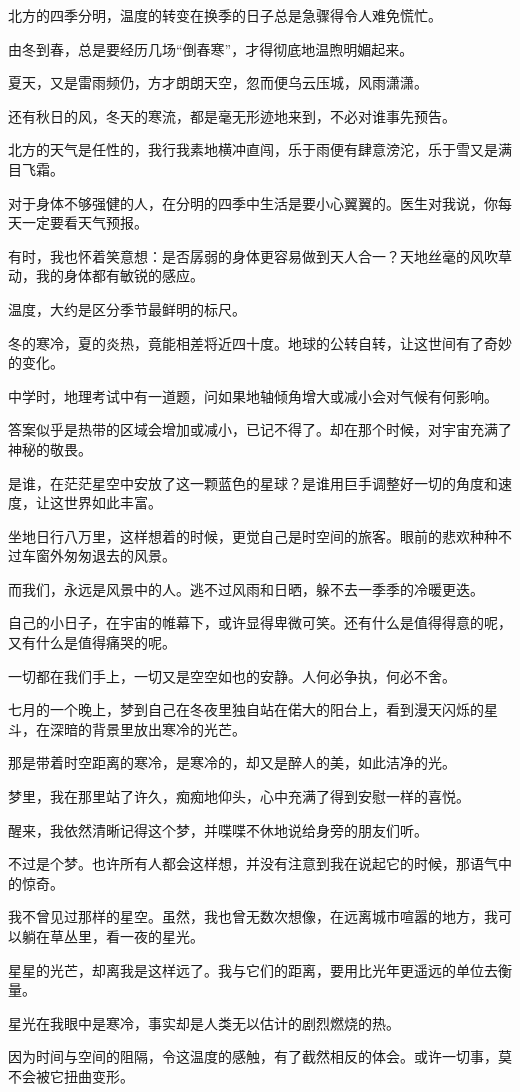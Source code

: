 \documentclass[12pt,a4paper]{article}
\def\blankrev{\vspace{1ex}}									%
\begin{document}
		\blankrev
		北方的四季分明，温度的转变在换季的日子总是急骤得令人难免慌忙。\par
		由冬到春，总是要经历几场“倒春寒”，才得彻底地温煦明媚起来。\par
		夏天，又是雷雨频仍，方才朗朗天空，忽而便乌云压城，风雨潇潇。\par
		还有秋日的风，冬天的寒流，都是毫无形迹地来到，不必对谁事先预告。\par
		北方的天气是任性的，我行我素地横冲直闯，乐于雨便有肆意滂沱，乐于雪又是满目飞霜。\par
		对于身体不够强健的人，在分明的四季中生活是要小心翼翼的。医生对我说，你每天一定要看天气预报。\par
		有时，我也怀着笑意想：是否孱弱的身体更容易做到天人合一？天地丝毫的风吹草动，我的身体都有敏锐的感应。

		\blankrev
		温度，大约是区分季节最鲜明的标尺。\par
		冬的寒冷，夏的炎热，竟能相差将近四十度。地球的公转自转，让这世间有了奇妙的变化。\par
		中学时，地理考试中有一道题，问如果地轴倾角增大或减小会对气候有何影响。\par
		答案似乎是热带的区域会增加或减小，已记不得了。却在那个时候，对宇宙充满了神秘的敬畏。\par
		是谁，在茫茫星空中安放了这一颗蓝色的星球？是谁用巨手调整好一切的角度和速度，让这世界如此丰富。\par
		坐地日行八万里，这样想着的时候，更觉自己是时空间的旅客。眼前的悲欢种种不过车窗外匆匆退去的风景。\par
		而我们，永远是风景中的人。逃不过风雨和日晒，躲不去一季季的冷暖更迭。\par
		自己的小日子，在宇宙的帷幕下，或许显得卑微可笑。还有什么是值得得意的呢，又有什么是值得痛哭的呢。\par
		一切都在我们手上，一切又是空空如也的安静。人何必争执，何必不舍。

		\blankrev
		七月的一个晚上，梦到自己在冬夜里独自站在偌大的阳台上，看到漫天闪烁的星斗，在深暗的背景里放出寒冷的光芒。\par
		那是带着时空距离的寒冷，是寒冷的，却又是醉人的美，如此洁净的光。\par
		梦里，我在那里站了许久，痴痴地仰头，心中充满了得到安慰一样的喜悦。\par
		醒来，我依然清晰记得这个梦，并喋喋不休地说给身旁的朋友们听。\par
		不过是个梦。也许所有人都会这样想，并没有注意到我在说起它的时候，那语气中的惊奇。\par
		我不曾见过那样的星空。虽然，我也曾无数次想像，在远离城市喧嚣的地方，我可以躺在草丛里，看一夜的星光。\par
		星星的光芒，却离我是这样远了。我与它们的距离，要用比光年更遥远的单位去衡量。\par
		星光在我眼中是寒冷，事实却是人类无以估计的剧烈燃烧的热。\par
		因为时间与空间的阻隔，令这温度的感触，有了截然相反的体会。或许一切事，莫不会被它扭曲变形。
\end{document}
